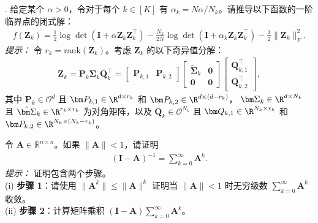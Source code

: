 \documentclass[../../book-main_zh.tex]{subfiles}
\begin{document}
\begin{exercise}
    . 给定某个 $\alpha >0$，令对于每个 $k \in [K]$ 有 $\alpha_k=N\alpha/N_k$。请推导以下函数的一阶临界点的闭式解：
    \begin{align*}
        f(\bm Z_k) = \frac{1}{2}\log\det\left(\bm I + \alpha\bm
        Z_k\bm Z_k^\top \right) - \frac{N_k}{2N}\log\det\left(\bm I +
        \alpha_k \bm Z_k\bm Z_k^\top \right) - \frac{\lambda}{2}\|\bm Z_k\|_F^2.
    \end{align*}
    {\em 提示：} 令 $r_k=\mathrm{rank}(\bm Z_k)$。考虑 $\bm Z_k$ 的以下奇异值分解：
    \begin{align*}
        \bm Z_k = \bm P_k\bm \Sigma_k\bm Q_k^\top =
        \begin{bmatrix}
            \bm P_{k,1} & \bm P_{k,2}
        \end{bmatrix}
        \begin{bmatrix}
            \tilde{\bm \Sigma}_{k} & \bm 0 \\
            \bm 0 & \bm 0
        \end{bmatrix}
        \begin{bmatrix}
            \bm Q_{k,1}^\top \\ \bm Q_{k,2}^\top
        \end{bmatrix},
    \end{align*}
    其中 $\bm P_k \in \mathcal{O}^d$ 且 $\bm P_{k,1} \in
    \R^{d\times r_k}$ 和  $\bm P_{k,2} \in \R^{d\times (d-r_k)}$，
    $\bm \Sigma_k \in \R^{d\times N_k}$ 且 $\tilde{\bm \Sigma}_{k}
    \in \R^{r_k\times r_k}$ 为对角矩阵，以及  $\bm Q_k
    \in \mathcal{O}^{N_k}$ 且 $\bm Q_{k,1} \in \R^{N_k\times r_k}$
    和  $\bm P_{k,2} \in \R^{N_k \times (N_k-r_k)}$。
    \medskip

\end{exercise}

\begin{exercise}[矩阵求逆的诺伊曼级数]\label{ex:neumannn}
    令 $\bm A \in \mathbb{R}^{n\times n}$。如果 $\|\bm A\| < 1$，请证明
    \begin{align}\label{eq:neumann}
        \left( \bm I - \bm A\right)^{-1} = \sum_{k=0}^\infty \bm A^k.
    \end{align}
    {\em 提示：} 证明包含两个步骤。 \\
    (i) {\bf 步骤 1}：请使用 $\|\bm A^k\| \le \|\bm A\|^k$ 证明当 $\|\bm A\| < 1$ 时无穷级数
    $\sum_{k=0}^\infty \bm A^k$ 收敛。 \\
    (ii) {\bf 步骤 2}：计算矩阵乘积 $(\bm I - \bm A)
    \sum_{k=0}^\infty \bm A^k$。
\end{exercise}
\end{document}
